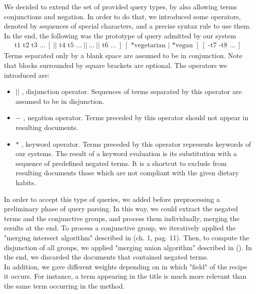 We decided to extend the set of provided query types, by also allowing terms conjunctions and negation. In order to do that, we introduced some operators, denoted by sequences of special characters, and a precise syntax rule to use them. In the end, the following was the prototype of query admitted by our system
\begin{align*}
	\text{t1 t2 t3 }\ldots \ [ \ || \text{ t4 t5 } \ldots \ || \ \ldots \ || \text{ t6 }\ldots \ ] \ [ \text{ *vegetarian } | \text{ *vegan }] \ [ \text{ -t7 -t8 }\ldots \ ]
\end{align*}
Terms separated only by a blank space are assumed to be in conjunction. Note that blocks surrounded by square brackets are optional. The operators we introduced are:
\begin{itemize}
	\item $||$ , disjunction operator. Sequences of terms separated by this operator are assumed to be in disjunction.
	
	\item $-$ , negation operator. Terms preceded by this operator should not appear in resulting documents.
	
	\item $*$ , keyword operator. Terms preceded by this operator represents keywords of our systems. The result of a keyword evaluation is its substitution with a sequence of predefined negated terms. It is a shortcut to exclude from resulting documents those which are not compliant with the given dietary habits.
\end{itemize}
In order to accept this type of queries, we added before preprocessing a preliminary phase of query parsing. In this way, we could extract the negated terms and the conjunctive groups, and process them individually, merging the results at the end. To process a conjunctive group, we iteratively applied the "merging intersect algorithm" described in \cite{iir} (ch. 1, pag. 11). Then, to compute the disjunction of all groups, we applied "merging union algorithm" described in \cite{iir} (). In the end, we discarded the documents that contained negated terms.\\
In addition, we gave different weights depending on in which "field" of the recipe it occurs. For instance, a term appearing in the title is much more relevant than the same term occurring in the method.




















